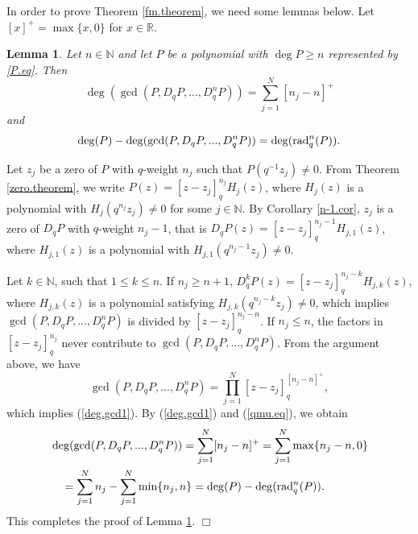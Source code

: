 \documentclass[a4paper,12pt]{article}
\newcommand{\N}{\mathbb{N}}
\newtheorem{lemma}[defin]{Lemma}
\newenvironment{proof}
{\noindent{\it Proof.}}{\hfill $\Box$\par\vspace{2.5mm}}
\numberwithin{equation}{section}
\begin{document}
In order to prove Theorem \ref{fm.theorem}, we need some lemmas below. Let $[x]^{+}=\max\{x,0\}$ for $x\in \mathbb{R}$.

\begin{lemma}\label{gcd.lemma}
Let $n\in \mathbb{N}$ and let $P$ be a polynomial with $\deg P \ge n$ represented by \eqref{P.eq}. Then
    \begin{equation}\label{deg.gcd1}
    \deg(\gcd(P,D_qP,...,D_q^nP))=\sum_{j=1}^N [n_j-n]^{+}
    \end{equation}
and
    $$
    \deg(P)-\deg(\gcd(P,D_qP,...,D_q^nP))=\deg({\rm rad} _q^{n}(P)).
    $$
\end{lemma}

\begin{proof}
Let $z_j$ be a zero of $P$ with $q$-weight $n_j$ such that $P(q^{-1}z_j)\ne 0$. From Theorem \ref{zero.theorem}, we write $P(z)=[z-z_j]_q^{n_j}H_j(z)$, where $H_j(z)$ is a polynomial with $H_j(q^{n_j}z_j)\ne 0$ for some $j\in\N$. By Corollary \ref{n-1.cor}, $z_j$ is a zero of $D_qP$ with $q$-weight $n_j-1$, that is $D_qP(z) = [z-z_j]_q^{n_j-1}H_{j,1}(z)$, where $H_{j,1}(z)$ is a polynomial with $H_{j,1}(q^{n_j-1}z_j)\ne 0$.

Let $k\in \mathbb{N}$, such that $1\le k \le n$. If $n_j \ge n+1$, $D_q^kP(z)=[z-z_j]_q^{n_j-k}H_{j,k}(z)$, where $H_{j,k}(z)$ is a polynomial satisfying $H_{j,k}(q^{n_j-k}z_j)\ne 0$, which implies ${\gcd(P,D_qP,...,D_q^nP)}$ is divided by $[z-z_j]_q^{n_j-n}$.
If $n_j\le n$, the factors in $[z-z_j]_q^{n_j}$ never contribute to ${\gcd(P,D_qP,...,D_q^nP)}$. From the argument above, we have
$$
    \gcd(P,D_qP,...,D_q^nP)=\prod_{j=1}^{N}[z-z_j]_q^{[n_j-n]^{+}},
$$
which implies (\ref{deg.gcd1}). By (\ref{deg.gcd1}) and (\ref{qmu.eq}), we obtain
\begin{align}\nonumber
&\deg(\gcd(P,D_qP,...,D_q^nP))=\sum_{j=1}^N [n_j-n]^{+}=\sum_{j=1}^{N}\max\{n_j-n,0\}
\\\nonumber
&\quad = \sum_{j=1}^{N}n_j - \sum_{j=1}^{N}\min\{n_j,n\} = \deg(P)-\deg({\rm rad}_q^n(P)).
\end{align}
This completes the proof of Lemma \ref{gcd.lemma}.
\end{proof}
\end{document}
